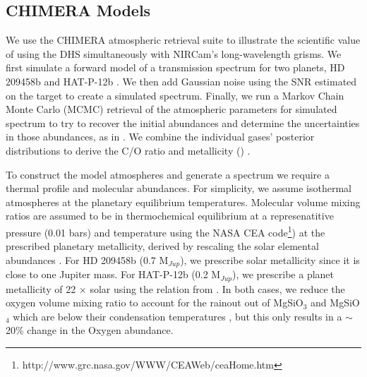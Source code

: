 \documentclass[iop]{emulateapj}
\begin{document}
\subsection{CHIMERA Models}\label{sec:models}


We use the CHIMERA atmospheric retrieval suite \citep{line2013chimera,line2014CtOsecE} to illustrate the scientific value of using the DHS simultaneously with NIRCam's long-wavelength grisms.
We first simulate a forward model of a transmission spectrum for two planets, HD 209458b \citep{henry00,charbonneau00} and HAT-P-12b \citep{hartman2009hatp12}.
We then add Gaussian noise using the SNR estimated on the target to create a simulated spectrum.
Finally, we run a Markov Chain Monte Carlo (MCMC) retrieval of the atmospheric parameters for simulated spectrum to try to recover the initial abundances and determine the uncertainties in those abundances, as in \citet{greene2016jwst_trans}.
We combine the individual gases' posterior distributions to derive the C/O ratio and metallicity (\citet{greene2016jwst_trans}) .



To construct the model atmospheres and generate a spectrum we require a thermal profile and molecular abundances. For simplicity, we assume isothermal atmospheres at the planetary equilibrium temperatures. Molecular volume mixing ratios are assumed to be in thermochemical equilibrium at a represenatitive pressure (0.01 bars) and temperature using the NASA CEA code\footnote{http://www.grc.nasa.gov/WWW/CEAWeb/ceaHome.htm}\citep{gordon1996cea}) at the prescribed planetary metallicity, derived by rescaling the solar elemental abundances \citep{asplund}.
For HD 209458b (0.7 M$_{Jup}$), we prescribe solar metallicity since it is close to one Jupiter mass.
For HAT-P-12b (0.2 M$_{Jup}$), we prescribe a planet metallicity of 22 $\times$ solar using the relation from \citet{kreidberg2014wasp43}.
In both cases, we reduce the oxygen volume mixing ratio to account for the rainout out of MgSiO$_3$ and MgSiO$_4$ which are below their condensation temperatures \citep{sing2016continuum}, but this only results in a $\sim$ 20\% change in the Oxygen abundance.
\end{document}

